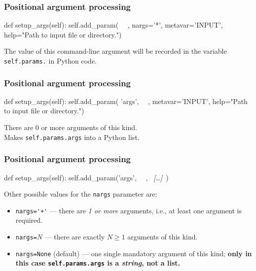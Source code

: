 \documentclass[english,serif,mathserif,xcolor=pdftex,dvipsnames,table]{beamer}
\begin{document}
\begin{frame}[fragile]
  \frametitle{Positional argument processing}

\begin{python}
  def setup_args(self):
    self.add_param(
      ~~, nargs='*', metavar='INPUT',
      help="Path to input file or directory.")
\end{python}

  \+
  The value of this command-line argument will be recorded in the
  variable \texttt{self.params.} in Python code.
\end{frame}


\begin{frame}[fragile]
  \frametitle{Positional argument processing}

\begin{python}
  def setup_args(self):
    self.add_param(
      'args', ~~, metavar='INPUT',
      help="Path to input file or directory.")
\end{python}

  \+
  There are 0 or more arguments of this kind.  \\
  Makes \lstinline|self.params.args| into a Python list.
\end{frame}


\begin{frame}[fragile]
  \frametitle{Positional argument processing}

\begin{python}
  def setup_args(self):
    self.add_param('args', ~~, ~{\em [\ldots]}~)
\end{python}

  \+
  Other possible values for the \texttt{nargs} parameter are:
  \begin{itemize}
  \item \lstinline|nargs='+'| --- there are \emph{1 or more} arguments,
    i.e., at least one argument is required.
  \item \lstinline|nargs=|$N$ --- there are exactly $N \geq 1$ arguments of this kind.
  \item \lstinline|nargs=None| (default) --- one single mandatory
    argument of this kind; \textbf{only in this case
      \lstinline|self.params.args| is a \emph{string}, not a list.}
  \end{itemize}
\end{frame}
\end{document}
